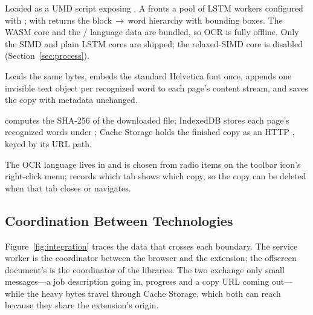 \begin{description}[leftmargin=1.4em, style=nextline]
  \item[Tesseract.js.] Loaded as a UMD script exposing . A
         fronts a pool of LSTM 
        workers configured with ; 
        with  returns the block\,$\to$\,word hierarchy with
        bounding boxes. The WASM core and the / language data
        are bundled, so OCR is fully offline. Only the SIMD and plain LSTM cores
        are shipped; the relaxed-SIMD core is disabled (Section~\ref{sec:process}).
  \item[pdf-lib.] Loads the same bytes, embeds the standard Helvetica font once,
        appends one invisible text object per recognized word to each page's
        content stream, and saves the copy with metadata unchanged.
  \item[Web Crypto, IndexedDB, Cache Storage.] 
        computes the SHA-256 of the downloaded file; IndexedDB stores each page's
        recognized words under ; Cache Storage holds the
        finished copy as an HTTP , keyed by its URL path.
  \item[\code{chrome.storage} and \code{chrome.contextMenus}.] The OCR language
        lives in  and is chosen from radio items on the toolbar
        icon's right-click menu;  records which tab shows
        which copy, so the copy can be deleted when that tab closes or navigates.
\end{description}

\subsection{Coordination Between Technologies}
Figure~\ref{fig:integration} traces the data that crosses each boundary. The
service worker is the coordinator between the browser and the extension; the
offscreen document's  is the coordinator of the libraries.
The two exchange only small messages---a job description going in, progress and
a copy URL coming out---while the heavy bytes travel through Cache Storage, which
both can reach because they share the extension's origin.


